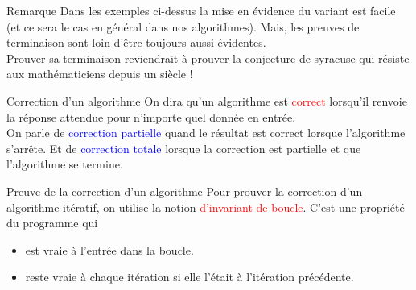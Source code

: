 \documentclass[10pt]{beamer}
\begin{document}
    \begin{frame}[fragile]{\Ctitle}{\stitle}
        \begin{block}{Remarque}
            Dans les exemples ci-dessus la mise en évidence du variant est facile (et ce sera le cas en général dans nos algorithmes). Mais, les preuves de terminaison sont loin d'être toujours aussi évidentes.\\
             Prouver sa terminaison reviendrait à prouver la conjecture de syracuse qui résiste aux mathématiciens depuis un siècle !
        \end{block}
    \end{frame}

\begin{frame}[fragile]{\Ctitle}{\stitle}
\begin{alertblock}{Correction d'un algorithme}
    On dira qu'un algorithme est \textcolor{red}{correct}
     lorsqu'il renvoie la réponse attendue pour n'importe quel donnée en entrée.\\
     On parle de \textcolor{blue}{correction partielle} quand le résultat est correct lorsque l'algorithme s'arrête. Et de \textcolor{blue}{correction totale} lorsque la correction est partielle et que l'algorithme se termine.
\end{alertblock}
\end{frame}

\begin{frame}[fragile]{\Ctitle}{\stitle}
\begin{alertblock}{Preuve de la correction d'un algorithme}
    Pour prouver la correction d'un algorithme itératif, on utilise la notion \textcolor{red}{d'invariant de boucle}. C'est une propriété du programme qui
    \begin{itemize}
        \item<2-> est vraie à l'entrée dans la boucle.
        \item<3-> reste vraie à chaque itération si elle l'était à l'itération précédente.
    \end{itemize}
\end{alertblock}
\end{frame}
\end{document}
